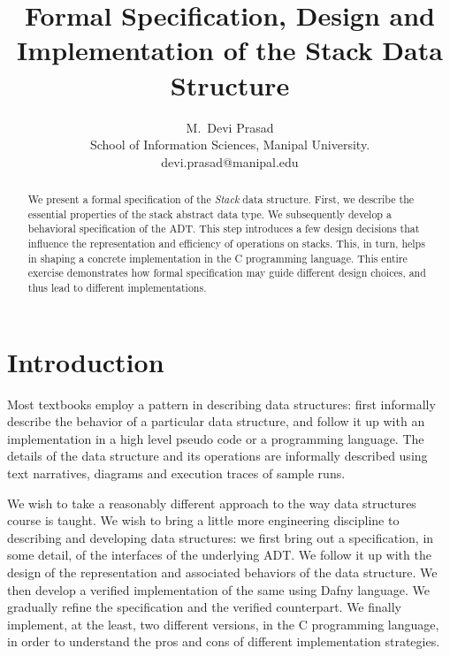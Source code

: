 \documentclass[10pt]{article}
\begin{document}
\title{Formal Specification, Design and Implementation of the Stack Data Structure}
\author{
  M.\, Devi Prasad\\
  School of Information Sciences, Manipal University.\vspace*{6pt}\\
  devi.prasad@manipal.edu
 }
\date{}
\maketitle

\begin{abstract}
We present a formal specification of the \emph{Stack} data structure. First, we describe the essential properties of the stack abstract data type. We subsequently develop a behavioral specification of the ADT. This step introduces a few design decisions that influence the representation and efficiency of operations on stacks. This, in turn, helps in shaping a concrete implementation in the C programming language. This entire exercise demonstrates how formal specification may guide different design choices, and thus lead to different implementations.
\end{abstract}

\section{Introduction}
Most textbooks employ a pattern in describing data structures: first informally describe the behavior of a particular data structure, and follow it up with an implementation in a high level pseudo code or a programming language. The details of the data structure and its operations are informally described using text narratives, diagrams and execution traces of sample runs. 

We wish to take a reasonably different approach to the way data structures course is taught. We wish to bring a little more engineering discipline to describing and developing data structures: we first bring out a specification, in some detail, of the interfaces of the underlying ADT. We follow it up with the design of the representation and associated behaviors of the data structure. We then develop a verified implementation of the same using Dafny language. We gradually refine the specification and the verified counterpart. We finally implement, at the least, two different versions, in the C programming language, in order to understand the pros and cons of different implementation strategies.
\end{document}
